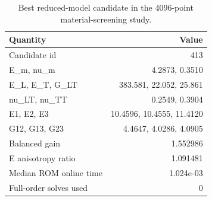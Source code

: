 \begin{table}
\centering
\small
\caption{Best reduced-model candidate in the 4096-point material-screening study.}
\label{tab:screening_best}
\begin{tabular}{lr}
\toprule
Quantity & Value \\
\midrule
Candidate id & 413 \\
E\_m, nu\_m & 4.2873, 0.3510 \\
E\_L, E\_T, G\_LT & 383.581, 22.052, 25.861 \\
nu\_LT, nu\_TT & 0.2549, 0.3904 \\
E1, E2, E3 & 10.4596, 10.4555, 11.4120 \\
G12, G13, G23 & 4.4647, 4.0286, 4.0905 \\
Balanced gain & 1.552986 \\
E anisotropy ratio & 1.091481 \\
Median ROM online time & 1.024e-03 \\
Full-order solves used & 0 \\
\bottomrule
\end{tabular}
\end{table}
